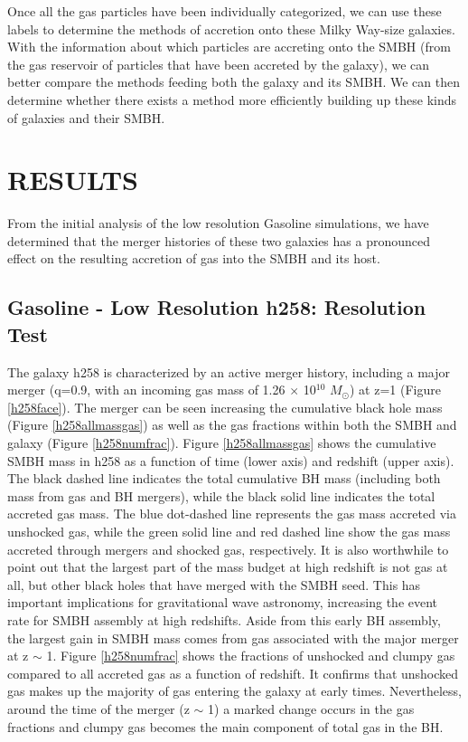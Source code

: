 \documentclass[12pt,headA,chapB]{fiskthesis}
\begin{document}
Once all the gas particles have been individually categorized, we can use these labels to determine the methods of accretion onto these Milky Way-size galaxies. With the information about which particles are accreting onto the SMBH (from the gas reservoir of particles that have been accreted by the galaxy), we can better compare the methods feeding both the galaxy and its SMBH. We can then determine whether there exists a method more efficiently building up these kinds of galaxies and their SMBH.


\chapter{\normalsize RESULTS}
\thispagestyle{empty}
From the initial analysis of the low resolution Gasoline simulations, we have determined that the merger histories of these two galaxies has a pronounced effect on the resulting accretion of gas into the SMBH and its host. 

\section{Gasoline - Low Resolution h258: Resolution Test}
	
The galaxy h258 is characterized by an active merger history, including a major merger (q=0.9, with an incoming gas mass of 1.26 $\times$ 10$^10$ $M_{\odot}$) at z=1 (Figure \ref{h258face}). The merger can be seen increasing the cumulative black hole mass (Figure \ref{h258allmassgas}) as well as the gas fractions within both the SMBH and galaxy (Figure \ref{h258numfrac}). Figure \ref{h258allmassgas} shows the cumulative SMBH mass in h258 as a function of time (lower axis) and redshift (upper axis). The black dashed line indicates the total cumulative BH mass (including both mass from gas and BH mergers), while the black solid line indicates the total accreted gas mass. The blue dot-dashed line represents the gas mass accreted via unshocked gas, while the green solid line and red dashed line show the gas mass accreted through mergers and shocked gas, respectively. It is also worthwhile to point out that the largest part of the mass budget at high redshift is not gas at all, but other black holes that have merged with the SMBH seed. This has important implications for gravitational wave astronomy, increasing the event rate for SMBH assembly at high redshifts. \citep{Holley-Bockelmann2010} Aside from this early BH assembly, the largest gain in SMBH mass comes from gas associated with the major merger at z $\sim$ 1. Figure \ref{h258numfrac} shows the fractions of unshocked and clumpy gas compared to all accreted gas as a function of redshift. It confirms that unshocked gas makes up the majority of gas entering the galaxy at early times. Nevertheless, around the time of the merger (z $\sim$ 1) a marked change occurs in the gas fractions and clumpy gas becomes the main component of total gas in the BH.
\end{document}
